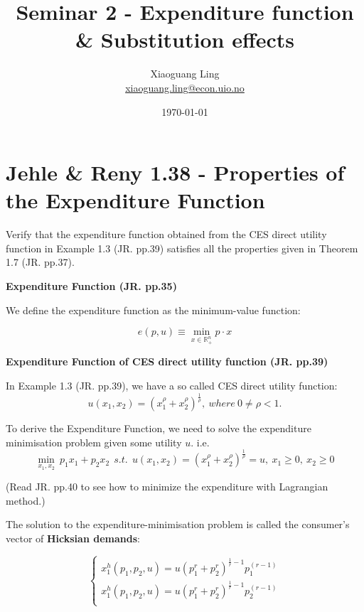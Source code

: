 \documentclass{article}
\title{Seminar 2 - Expenditure function \& Substitution effects}
\author{Xiaoguang Ling \\  \href{xiaoguang.ling@econ.uio.no}{xiaoguang.ling@econ.uio.no}}
\date{\today}
\newcommand{\R}{\mathbb{R}}
\begin{document}
\maketitle

\section{Jehle \& Reny 1.38 - Properties of the Expenditure Function}
Verify that the expenditure function obtained from the CES direct utility function in Example 1.3 
(JR. pp.39) satisfies all the properties given in Theorem 1.7 (JR. pp.37).

\begin{mdframed}[backgroundcolor=blue!20,linecolor=white]

\textbf{Expenditure Function (JR. pp.35)}

\medskip

We define the expenditure function as the minimum-value function:

$$e(p, u) \equiv \min_{x \in \R^n_+} p \cdot x$$

\textbf{Expenditure Function of CES direct utility function (JR. pp.39)}

\medskip

In Example 1.3 (JR. pp.39), we have a so called CES  direct utility function:
$$u(x_1, x_2) = (x_1^{\rho} + x_2^{\rho})^{\frac{1}{\rho}},\ where \ 0 \ne \rho<1.$$

To derive the Expenditure Function, we need to solve the expenditure minimisation problem
given some utility $u$. i.e.
$$\min_{x_1,x_2} \ p_1x_1 + p_2x_2 \ \ s.t.  \ \ u(x_1, x_2) = (x_1^{\rho} + x_2^{\rho})^{\frac{1}{\rho}} = u, \ x_1 \ge 0, \ x_2 \ge 0$$

(Read JR. pp.40 to see how to minimize the expenditure with Lagrangian method.)

\medskip

The solution to the expenditure-minimisation problem is called the consumer’s
vector of \textbf{Hicksian demands}:

\begin{equation}
    \begin{cases}
    x_1^h(p_1,p_2,u) = u(p_1^{r} + p_2^{r})^{\frac{1}{r}-1} p_1^{(r-1)} \\	
    x_1^h(p_1,p_2,u) = u(p_1^{r} + p_2^{r})^{\frac{1}{r}-1} p_2^{(r-1)} \\	
    \end{cases}
    \label{eq:1_38_hicks}   
\end{equation}


\end{mdframed}
\end{document}
